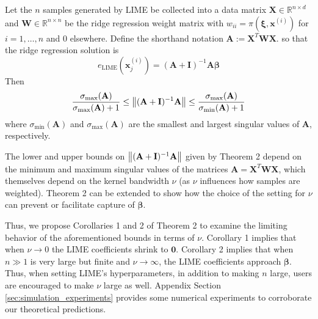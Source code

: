 \documentclass[mnsc,blindrev]{informs3}
\begin{document}
            \begin{theorem}
                 Let the $n$ samples generated by LIME be collected into a data matrix $\mathbf{X}\in\mathbb{R}^{n\times d}$ and $\mathbf{W}\in\mathbb{R}^{n\times n}$ be the ridge regression weight matrix with $w_{ii} = \pi(\boldsymbol{\xi},\mathbf{x}^{(i)})$ for $i=1,\ldots,n$ and 0 elsewhere. Define the shorthand notation $\mathbf{A}:= \mathbf{X}^T \mathbf{W}\mathbf{X}$. so that the ridge regression solution is
                \begin{equation*}
                    e_{\text{LIME}}(\mathbf{x}^{(i)}_j) = (\mathbf{A} + \mathbf{I})^{-1}\mathbf{A} \boldsymbol{\beta}
                \end{equation*}
                Then
                \begin{equation*}
                    \frac{\sigma_{\max}(\mathbf{A})}{\sigma_{\max}(\mathbf{A}) + 1} \leq \norm{(\mathbf{A} + \mathbf{I})^{-1}\mathbf{A}} \leq \frac{\sigma_{\max}(\mathbf{A})}{\sigma_{\min}(\mathbf{A}) + 1}
                \end{equation*}
                where $\sigma_{\min}(\mathbf{A})$ and $\sigma_{\max}(\mathbf{A})$ are the smallest and largest singular values of $\mathbf{A}$, respectively. 
            \end{theorem}
            The lower and upper bounds on $\norm{(\mathbf{A} + \mathbf{I})^{-1}\mathbf{A}}$ given by Theorem 2 depend on the minimum and maximum singular values of the matrices $\mathbf{A}=\mathbf{X}^T\mathbf{W}\mathbf{X}$, which themselves depend on the kernel bandwidth $\nu$ (as $\nu$ influences how samples are weighted). Theorem 2 can be extended to show how the choice of the setting for $\nu$ can prevent or facilitate capture of $\boldsymbol{\beta}$.
            
            Thus, we propose Corollaries 1 and 2 of Theorem 2 to examine the limiting behavior of the aforementioned bounds in terms of $\nu$. Corollary 1 implies that when $\nu \rightarrow 0$ the LIME coefficients shrink to $\mathbf{0}$. Corollary 2 implies that when $n \gg 1$ is very large but finite and $\nu \rightarrow \infty$, the LIME coefficients approach $\boldsymbol{\beta}$.  Thus, when setting LIME's hyperparameters, in addition to making $n$ large, users are encouraged to make $\nu$ large as well. Appendix Section \ref{sec:simulation_experiments} provides some numerical experiments to corroborate our theoretical predictions. 
            
             
\end{document}

